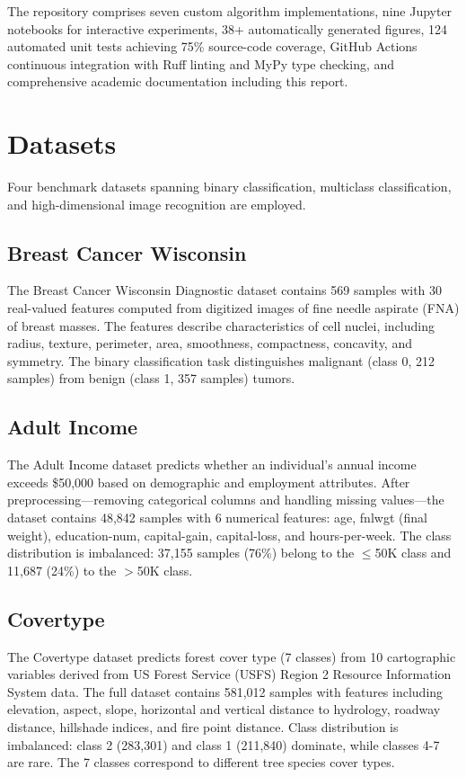 \documentclass[conference,12pt]{IEEEtran}
\begin{document}
The repository comprises seven custom algorithm implementations, nine Jupyter notebooks for interactive experiments, 38+ automatically generated figures, 124 automated unit tests achieving 75\% source-code coverage, GitHub Actions continuous integration with Ruff linting and MyPy type checking, and comprehensive academic documentation including this report.

\section{Datasets}

Four benchmark datasets spanning binary classification, multiclass classification, and high-dimensional image recognition are employed.

\subsection{Breast Cancer Wisconsin}

The Breast Cancer Wisconsin Diagnostic dataset \cite{dheeru2017uci} contains 569 samples with 30 real-valued features computed from digitized images of fine needle aspirate (FNA) of breast masses. The features describe characteristics of cell nuclei, including radius, texture, perimeter, area, smoothness, compactness, concavity, and symmetry. The binary classification task distinguishes malignant (class 0, 212 samples) from benign (class 1, 357 samples) tumors.

\subsection{Adult Income}

The Adult Income dataset \cite{dheeru2017uci} predicts whether an individual's annual income exceeds \$50,000 based on demographic and employment attributes. After preprocessing---removing categorical columns and handling missing values---the dataset contains 48,842 samples with 6 numerical features: age, fnlwgt (final weight), education-num, capital-gain, capital-loss, and hours-per-week. The class distribution is imbalanced: 37,155 samples (76\%) belong to the $\leq$50K class and 11,687 (24\%) to the $>$50K class.

\subsection{Covertype}

The Covertype dataset \cite{dheeru2017uci} predicts forest cover type (7 classes) from 10 cartographic variables derived from US Forest Service (USFS) Region 2 Resource Information System data. The full dataset contains 581,012 samples with features including elevation, aspect, slope, horizontal and vertical distance to hydrology, roadway distance, hillshade indices, and fire point distance. Class distribution is imbalanced: class 2 (283,301) and class 1 (211,840) dominate, while classes 4-7 are rare. The 7 classes correspond to different tree species cover types.
\end{document}
